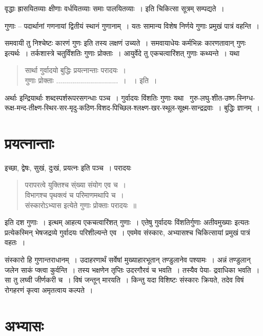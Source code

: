 {वृद्धाः ह्रासयितव्याः क्षीणाः वर्धयितव्याः समाः पालयितव्याः~। इति चिकित्सा सूत्रम् सम्पद्यते~। 

गुणाः – पदार्थानां गणनायां द्वितीयं स्थानं गुणानाम्~। यतः सामान्य विशेष निर्णये गुणाः प्रमुखं पात्रं वहन्ति~। 


समवायी तु निश्चेष्टः कारणं गुणः इति तस्य लक्षणं उच्यते~। समवायाधेयः कर्मभिन्नः कारणतावान् गुणः इत्यर्थः~। तर्कशास्त्रे चतुर्विंशतिः गुणाः प्रोक्ताः~। आयुर्वेदे तु एकचत्वारिंशत् गुणाः कथ्यन्ते~। यथा

\begin{verse}
सार्था गुर्वादयो बुद्धिः प्रयत्नान्ताः परादयः~। \\
गुणाः प्रोक्ताः ...............................~। ~। इति~। 
\end{verse}
अर्थाः इन्द्रियार्थाः शब्दस्पर्शरूपरसगन्धाः पञ्च~। गुर्वादयः विंशतिः गुणाः यथा \ गुरु-लघु-शीत-उष्ण-स्निग्ध- रूक्ष-मन्द-तीक्ष्ण-स्थिर-सर-मृदु-कठिण-विशद-पिच्छिल-श्लक्ष्ण-खर-स्थूल-सूक्ष्म-सान्द्रद्रवाः~। बुद्धिः ज्ञानम्~। 

\section*{प्रयत्नान्ताः}

इच्छा, द्वेषः, सुखं, दुःखं, प्रयत्नः इति पञ्च~। परादयः

\begin{verse}
परापरत्वे युक्तिश्च स्ंख्या संयोग एव च~। \\
विभागश्च पृथक्त्वं च परिमाणमथापि च~। \\
संस्कारोऽभ्यास इत्येते गुणाः प्रोक्ताः परादयः~॥
\end{verse}
इति दश गुणाः~। इत्थम् आहत्य एकचत्वारिंशत् गुणाः~। एतेषु गुर्वादयः विंशतिर्गुणाः अतीवमुख्याः इत्यतः प्रत्येकस्मिन् भेषजद्रव्ये गुर्वादयः परिशील्यन्ते एव~। एवमेव संस्कारः, अभ्यासश्च चिकित्सायां प्रमुखं पात्रं वहतः~। 

संस्कारो हि गुणान्तराधानम्~। उदाहरणार्थं सर्वेषां मुख्याहारभूतान् तण्डुलानेव पश्यामः~। अन्नं तण्डुलान् जलेन साकं प्क्त्वा कुर्वन्ति~। तस्य भक्षणेन तृप्तिः उदरगौरवं च भवति~। तस्यैव पेया- {\fontsize{14}{16}\selectfont {}} द्रवाधिका भवति~। सा तु लघ्वी जीर्णकरी च~। विषं जन्तून् मारयति~। किन्तु यदा विशिष्टः संस्कारः क्रियते, तदेव विषं रोगहरणं कृत्वा अमृतत्वाय कल्पते~। 

\section*{अभ्यासः}

}
